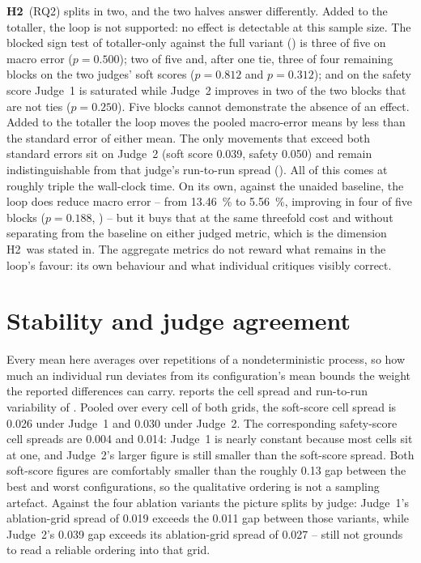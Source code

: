 \textbf{H2}~(RQ2) splits in two, and the two halves answer differently. Added to the totaller, the loop is not supported: no effect is detectable at this sample size. The blocked sign test of totaller-only against the full variant () is three of five on macro error ($p = \num{0.500}$); two of five and, after one tie, three of four remaining blocks on the two judges' soft scores ($p = \num{0.812}$ and $p = \num{0.312}$); and on the safety score Judge~1 is saturated while Judge~2 improves in two of the two blocks that are not ties ($p = \num{0.250}$). Five blocks cannot demonstrate the absence of an effect. Added to the totaller the loop moves the pooled macro-error means by less than the standard error of either mean. The only movements that exceed both standard errors sit on Judge~2 (soft score \num{0.039}, safety \num{0.050}) and remain indistinguishable from that judge's run-to-run spread (). All of this comes at roughly triple the wall-clock time. On its own, against the unaided baseline, the loop does reduce macro error -- from \qty{13.46}{\percent} to \qty{5.56}{\percent}, improving in four of five blocks ($p = \num{0.188}$, ) -- but it buys that at the same threefold cost and without separating from the baseline on either judged metric, which is the dimension H2~was stated in. The aggregate metrics do not reward what remains in the loop's favour: its own behaviour and what individual critiques visibly correct.

\section{Stability and judge agreement}
\label{sec:results-stability}

Every mean here averages over repetitions of a nondeterministic process, so how much an individual run deviates from its configuration's mean bounds the weight the reported differences can carry.  reports the cell spread and run-to-run variability of . Pooled over every cell of both grids, the soft-score cell spread is \num{0.026} under Judge~1 and \num{0.030} under Judge~2. The corresponding safety-score cell spreads are \num{0.004} and \num{0.014}: Judge~1 is nearly constant because most cells sit at one, and Judge~2's larger figure is still smaller than the soft-score spread. Both soft-score figures are comfortably smaller than the roughly \num{0.13} gap between the best and worst configurations, so the qualitative ordering is not a sampling artefact. Against the four ablation variants the picture splits by judge: Judge~1's ablation-grid spread of \num{0.019} exceeds the \num{0.011} gap between those variants, while Judge~2's \num{0.039} gap exceeds its ablation-grid spread of \num{0.027} -- still not grounds to read a reliable ordering into that grid.

